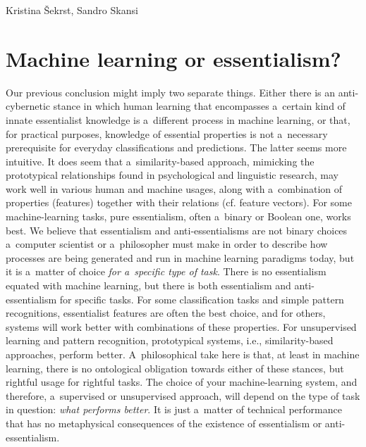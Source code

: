 \begin{artengenv2auth}{Kristina Šekrst, Sandro Skansi}
\section*{Machine learning or essentialism?}
Our previous conclusion might imply two separate things. Either there is an anti-cybernetic stance in which human learning that encompasses a~certain kind of innate essentialist knowledge is a~different process in machine learning, or that, for practical purposes, knowledge of essential properties is not a~necessary prerequisite for everyday classifications and predictions. The latter seems more intuitive. It does seem that a~similarity-based approach, mimicking the prototypical relationships found in psychological and linguistic research, may work well in various human and machine usages, along with a~combination of properties (features) together with their relations (cf. feature vectors). For some machine-learning tasks, pure essentialism, often a~binary or Boolean one, works best. We believe that essentialism and anti-essentialisms are not binary choices a~computer scientist or a~philosopher must make in order to describe how processes are being generated and run in machine learning paradigms today, but it is a~matter of choice \textit{for a~specific type of task}. There is no essentialism equated with machine learning, but there is both essentialism and anti-essentialism for specific tasks. For some classification tasks and simple pattern recognitions, essentialist features are often the best choice, and for others, systems will work better with combinations of these properties. For unsupervised learning and pattern recognition, prototypical systems, i.e., similarity-based approaches, perform better. A~philosophical take here is that, at least in machine learning, there is no ontological obligation towards either of these stances, but rightful usage for rightful tasks. The choice of your machine-learning system, and therefore, a~supervised or unsupervised approach, will depend on the type of task in question: \textit{what performs better}. It is just a~matter of technical performance that has no metaphysical consequences of the existence of essentialism or anti-essentialism.


\end{artengenv2auth}
